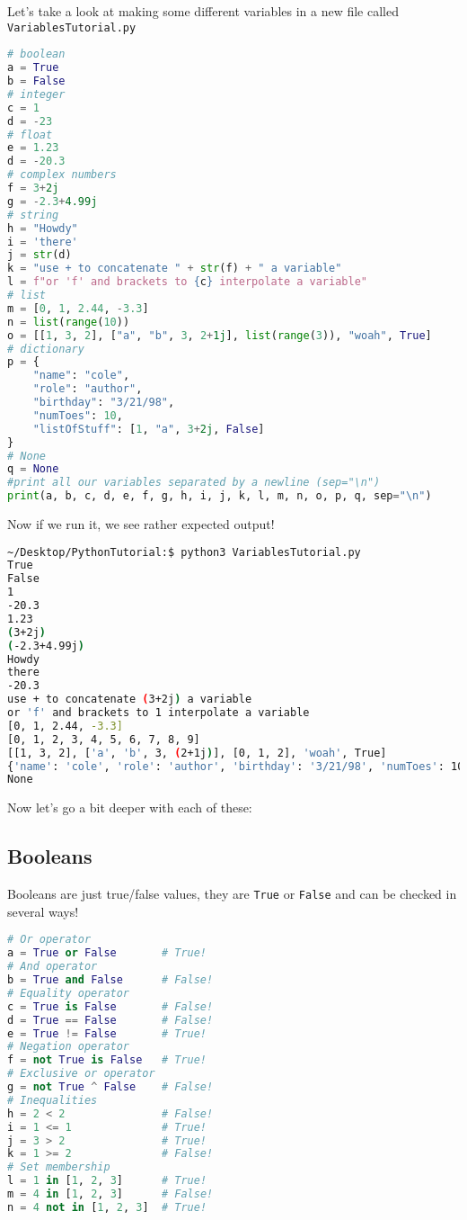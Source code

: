 \documentclass[12pt, twoside, reqno]{book}
\begin{document}
Let's take a look at making some different variables in a new file called \texttt{VariablesTutorial.py}
\begin{lstlisting}[language=Python]
# boolean
a = True
b = False
# integer
c = 1
d = -23
# float
e = 1.23
d = -20.3
# complex numbers
f = 3+2j
g = -2.3+4.99j
# string
h = "Howdy"
i = 'there'
j = str(d)
k = "use + to concatenate " + str(f) + " a variable"
l = f"or 'f' and brackets to {c} interpolate a variable"
# list
m = [0, 1, 2.44, -3.3]
n = list(range(10))
o = [[1, 3, 2], ["a", "b", 3, 2+1j], list(range(3)), "woah", True]
# dictionary
p = {
    "name": "cole",
    "role": "author",
    "birthday": "3/21/98",
    "numToes": 10,
    "listOfStuff": [1, "a", 3+2j, False]
}
# None
q = None
#print all our variables separated by a newline (sep="\n")
print(a, b, c, d, e, f, g, h, i, j, k, l, m, n, o, p, q, sep="\n")
\end{lstlisting}

Now if we run it, we see rather expected output!
\begin{lstlisting}[language=sh]
~/Desktop/PythonTutorial:$ python3 VariablesTutorial.py
True
False
1
-20.3
1.23
(3+2j)
(-2.3+4.99j)
Howdy
there
-20.3
use + to concatenate (3+2j) a variable
or 'f' and brackets to 1 interpolate a variable
[0, 1, 2.44, -3.3]
[0, 1, 2, 3, 4, 5, 6, 7, 8, 9]
[[1, 3, 2], ['a', 'b', 3, (2+1j)], [0, 1, 2], 'woah', True]
{'name': 'cole', 'role': 'author', 'birthday': '3/21/98', 'numToes': 10, 'listOfStuff': [1, 'a', (3+2j), False]}
None
\end{lstlisting}

Now let's go a bit deeper with each of these:

\subsection{Booleans}

Booleans are just true/false values, they are \texttt{True} or \texttt{False} and can be checked in several ways!
\begin{lstlisting}[language=Python]
# Or operator
a = True or False       # True!
# And operator
b = True and False      # False!
# Equality operator
c = True is False       # False!
d = True == False       # False!
e = True != False       # True!
# Negation operator
f = not True is False   # True!
# Exclusive or operator
g = not True ^ False    # False! 
# Inequalities
h = 2 < 2               # False!
i = 1 <= 1              # True!
j = 3 > 2               # True!
k = 1 >= 2              # False!
# Set membership
l = 1 in [1, 2, 3]      # True!
m = 4 in [1, 2, 3]      # False!
n = 4 not in [1, 2, 3]  # True!
\end{lstlisting}
\end{document}
